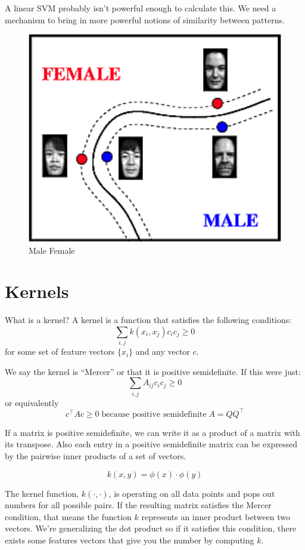 \documentclass[a4paper]{article}
\begin{document}
A linear SVM probably isn't powerful enough to calculate this.  We need a mechanism to bring in more powerful notions of similarity between patterns.

\begin{figure}
\centering
\includegraphics[width=1.0\textwidth]{male_female.png}
\caption{\label{fig:svm4}Male Female}
\end{figure}

\section{Kernels}

What is a kernel? A kernel is a function that satisfies the following conditions:
$$
\sum_{i,j} k(x_i, x_j) c_i c_j \geq 0
$$
for some set of feature vectors $\{x_i\}$ and any vector $c$.

We say the kernel is ``Mercer'' or that it is positive semidefinite. If this were just:
$$
\sum_{i,j} A_{ij} c_i c_j \geq 0
$$
or equivalently
$$
c^\top A c \geq 0 \; \text{because positive semidefinite} \; A = QQ^\top
$$

If a matrix is positive semidefinite, we can write it as a product of a matrix with its transpose.  Also each entry in a positive semidefinite matrix can be expressed by the pairwise inner products of a set of vectors.

$$
k(x,y) = \phi(x) \cdot \phi(y)
$$

The kernel function, $k(\cdot,\cdot)$, is operating on all data points and pops out numbers for all possible pairs.  If the resulting matrix satisfies the Mercer condition, that means the function $k$ represents an inner product between two vectors. We're generalizing the dot product so if it satisfies this condition, there exists some features vectors that give you the number by computing $k$.  
\end{document}
